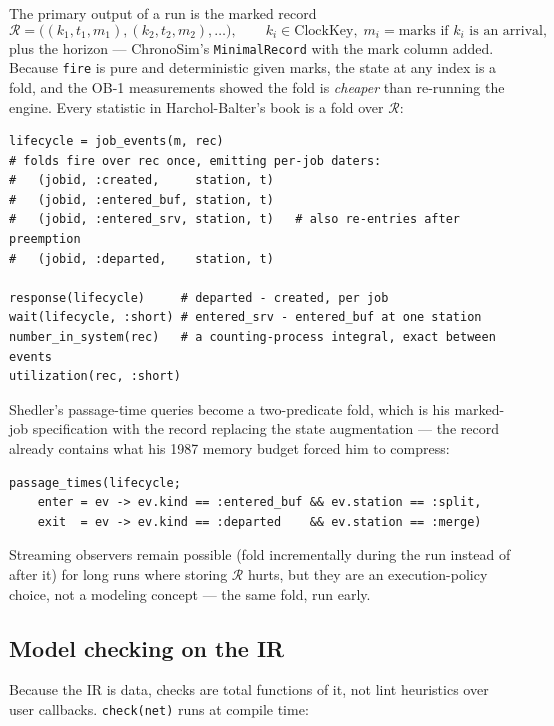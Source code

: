 \documentclass[11pt]{article}
\newcommand{\code}[1]{\texttt{#1}}
\begin{document}
The primary output of a run is the marked record
\[
\mathcal{R} = \big( (k_1, t_1, m_1), (k_2, t_2, m_2), \ldots \big),
\qquad k_i \in \text{ClockKey},\; m_i = \text{marks if } k_i \text{ is an arrival},
\]
plus the horizon --- ChronoSim's \code{MinimalRecord} with the mark column
added. Because \code{fire} is pure and deterministic given marks, the state at
any index is a fold, and the OB-1 measurements showed the fold is
\emph{cheaper} than re-running the engine. Every statistic in
Harchol-Balter's book is a fold over $\mathcal{R}$:

\begin{lstlisting}
lifecycle = job_events(m, rec)
# folds fire over rec once, emitting per-job daters:
#   (jobid, :created,     station, t)
#   (jobid, :entered_buf, station, t)
#   (jobid, :entered_srv, station, t)   # also re-entries after preemption
#   (jobid, :departed,    station, t)

response(lifecycle)     # departed - created, per job
wait(lifecycle, :short) # entered_srv - entered_buf at one station
number_in_system(rec)   # a counting-process integral, exact between events
utilization(rec, :short)
\end{lstlisting}

Shedler's passage-time queries become a two-predicate fold, which is his
marked-job specification with the record replacing the state augmentation ---
the record already contains what his 1987 memory budget forced him to
compress:

\begin{lstlisting}
passage_times(lifecycle;
    enter = ev -> ev.kind == :entered_buf && ev.station == :split,
    exit  = ev -> ev.kind == :departed    && ev.station == :merge)
\end{lstlisting}

Streaming observers remain possible (fold incrementally during the run instead
of after it) for long runs where storing $\mathcal{R}$ hurts, but they are an
execution-policy choice, not a modeling concept --- the same fold, run early.

\subsection{Model checking on the IR}
\label{sec:checking}

Because the IR is data, checks are total functions of it, not lint heuristics
over user callbacks. \code{check(net)} runs at compile time:
\end{document}
